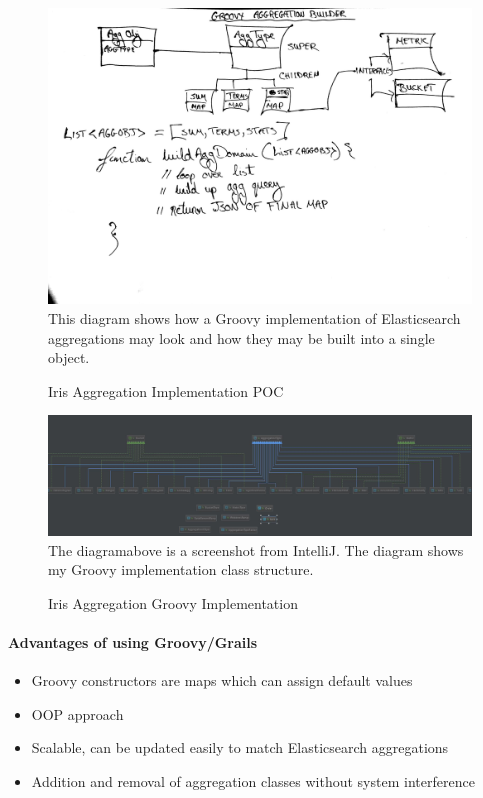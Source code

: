 \documentclass[12pt,a4paper,titlepage]{report}
\begin{document}
\begin{figure}[H]
\begin{tcolorbox}
\includegraphics[width=\textwidth,height=\textheight,keepaspectratio]{groovy_agg_builder_logic_1}
This diagram shows how a Groovy implementation of Elasticsearch aggregations may look and how they may be built into a single object.
\end{tcolorbox}
\caption{Iris Aggregation Implementation POC}
\end{figure}
\begin{figure}[H]
\begin{tcolorbox}
\includegraphics[width=\textwidth,height=\textheight,keepaspectratio]{intellij_agg_diagram}
The diagram\footnotemark above is a screenshot from IntelliJ. The diagram shows my Groovy implementation class structure.
\end{tcolorbox}
\caption{Iris Aggregation Groovy Implementation}
\end{figure}
\paragraph{Advantages of using Groovy/Grails}
\begin{itemize}
  \item Groovy constructors are maps which can assign default values
  \item OOP approach
  \item Scalable, can be updated easily to match Elasticsearch aggregations
  \item Addition and removal of aggregation classes without system interference
\end{itemize}
\end{document}
